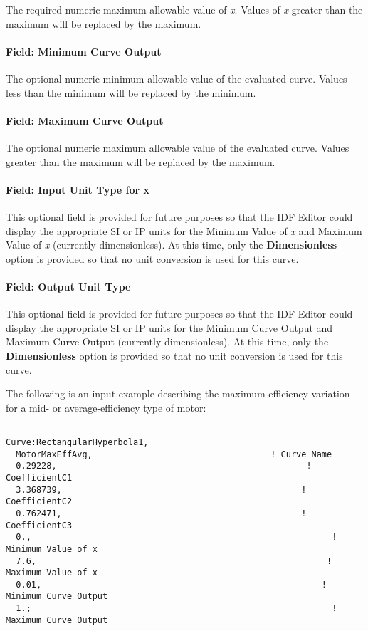 The required numeric maximum allowable value of \emph{x}. Values of \emph{x} greater than the maximum will be replaced by the maximum.

\paragraph{Field: Minimum Curve Output}\label{field-minimum-curve-output-14}

The optional numeric minimum allowable value of the evaluated curve. Values less than the minimum will be replaced by the minimum.

\paragraph{Field: Maximum Curve Output}\label{field-maximum-curve-output-13}

The optional numeric maximum allowable value of the evaluated curve. Values greater than the maximum will be replaced by the maximum.

\paragraph{Field: Input Unit Type for x}\label{field-input-unit-type-for-x-14}

This optional field is provided for future purposes so that the IDF Editor could display the appropriate SI or IP units for the Minimum Value of \emph{x} and Maximum Value of \emph{x} (currently dimensionless). At this time, only the \textbf{Dimensionless} option is provided so that no unit conversion is used for this curve.

\paragraph{Field: Output Unit Type}\label{field-output-unit-type-13}

This optional field is provided for future purposes so that the IDF Editor could display the appropriate SI or IP units for the Minimum Curve Output and Maximum Curve Output (currently dimensionless). At this time, only the \textbf{Dimensionless} option is provided so that no unit conversion is used for this curve.

The following is an input example describing the maximum efficiency variation for a mid- or average-efficiency type of motor:

\begin{lstlisting}

Curve:RectangularHyperbola1,
  MotorMaxEffAvg,                                   ! Curve Name
  0.29228,                                                 ! CoefficientC1
  3.368739,                                               ! CoefficientC2
  0.762471,                                               ! CoefficientC3
  0.,                                                           ! Minimum Value of x
  7.6,                                                         ! Maximum Value of x
  0.01,                                                       ! Minimum Curve Output
  1.;                                                           ! Maximum Curve Output
\end{lstlisting}

